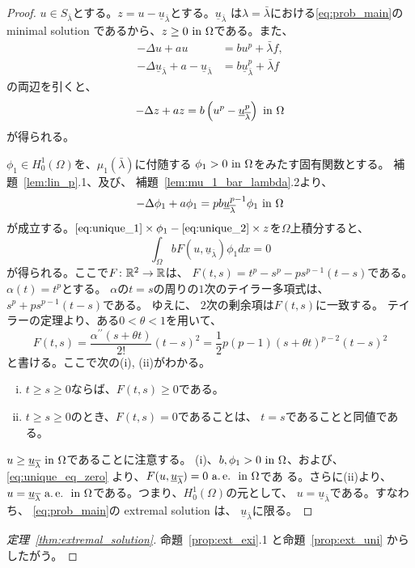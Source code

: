 \begin{proof}
 $u \in S_{\bar{\lambda}}$とする。$z = u -
 \underline{u}_{\bar{\lambda}}$とする。$\underline{u}_{\bar{\lambda}}$
 は$\lambda = \bar{\lambda}$における\ref{eq:prob_main}の
 minimal solution であるから、$z \geq 0 ~\text{in}~ \Omega$である。また、
 \begin{align*}
  -\Delta u + au &= bu^p + \bar{\lambda} f, \\
  -\Delta \underline{u}_{\bar{\lambda}} + a
  -\underline{u}_{\bar{\lambda}}
  &= b \underline{u}_{\bar{\lambda}}^p + \bar{\lambda} f
 \end{align*}
 の両辺を引くと、
 \begin{equation}
  -\Delta z + az = b \left( u^p - \underline{u}_{\overline{\lambda}}^p
 \right) ~\text{in}~ \Omega \label{eq:unique_1}
 \end{equation}
 が得られる。
 
 $\phi_1 \in H_0^1(\Omega)$を、$\mu_1(\bar{\lambda})$に付随する
 $\phi_1 > 0 ~\text{in}~ \Omega$をみたす固有関数とする。
 補題~\ref{lem:lin_p}.1、及び、
 補題~\ref{lem:mu_1_bar_lambda}.2より、
 \begin{equation}
  -\Delta \phi_1 + a\phi_1 = pb \underline{u}_{\overline{\lambda}}^{p-1}
   \phi_1 ~\text{in}~ \Omega \label{eq:unique_2}
 \end{equation}
 が成立する。$\text{\eqref{eq:unique_1}} \times \phi_1 -
 \text{\eqref{eq:unique_2}} \times z$を$\Omega$上積分すると、
 \begin{equation}
  \int_\Omega b F(u, \underline{u}_{\bar{\lambda}}) \phi_1 dx = 0
   \label{eq:unique_eq_zero}
 \end{equation}
 が得られる。ここで$F \colon \mathbb{R}^2 \to \mathbb{R}$は、
 $F(t, s) = t^p - s^p - ps^{p-1}(t-s)$である。
 $\alpha(t) = t^p$とする。
 $\alpha$の$t = s$の周りの$1$次のテイラー多項式は、
 $s^p + ps^{p-1}(t-s)$である。
 ゆえに、
 $2$次の剰余項は$F(t, s)$に一致する。
 テイラーの定理より、ある$0 < \theta < 1$を用いて、
 \[
  F(t, s) = \frac{\alpha^{\prime\prime}(s + \theta t)}{2!} (t-s)^2 = \frac{1}{2}
 p(p-1) (s+ \theta t)^{p-2} (t-s)^2
 \]
 と書ける。ここで次の(i), (ii)がわかる。
 \begin{enumerate}[(i)]
  \item $t \geq s \geq 0$ならば、$F(t, s) \geq 0$である。
  \item $t \geq s \geq 0$のとき、$F(t, s) = 0$であることは、
        $t = s$であることと同値である。
 \end{enumerate}
 $u \geq \underline{u}_{\overline{\lambda}} ~\text{in}~ \Omega$であることに注意する。
 (i)、$b, \phi_1 > 0 ~\text{in}~ \Omega$、および、\eqref{eq:unique_eq_zero}
 より、$F(u, \underline{u}_{\overline{\lambda}}) = 0 ~\text{a.\,e.}~ ~\text{in}~ \Omega$であ
 る。さらに(ii)より、$u = \underline{u}_{\overline{\lambda}} ~\text{a.\,e.}~ ~\text{in}~
 \Omega$である。つまり、$H_0^1(\Omega)$の元として、
 $u = \underline{u}_{\bar{\lambda}}$である。すなわち、
 \ref{eq:prob_main}の extremal solution は、
 $\underline{u}_{\bar{\lambda}}$に限る。 \qedhere
\end{proof}

\begin{proof}[定理~\ref{thm:extremal_solution}]
 命題~\ref{prop:ext_exi}.1 と命題~\ref{prop:ext_uni} からしたがう。\qedhere
\end{proof}


